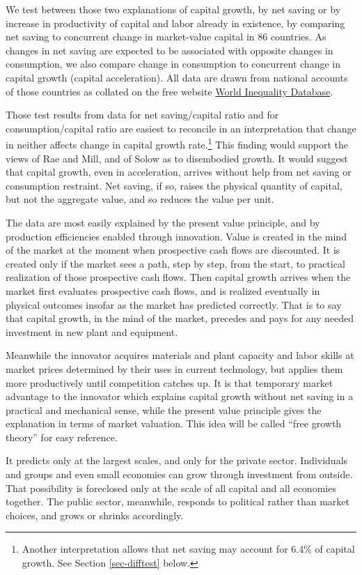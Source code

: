 \documentclass[a4paper,fleqn]{latex_styles/cas-sc}
\begin{document}
We test between those two explanations of capital growth, by net
saving or by increase in productivity of capital and labor already
in existence, by comparing net saving to concurrent change in
market-value capital in 86 countries. As changes in net saving
are expected to be associated with opposite changes in consumption, we
also compare change in consumption to concurrent change in capital
growth (capital acceleration). All data are drawn from national accounts
of those countries as collated on the free website \href{https://wid.world/}{World Inequality Database}.

Those test results from data for net saving/capital ratio and for consumption/capital ratio
are easiest to reconcile in an interpretation that change in neither affects
change in capital growth rate.\footnote{Another interpretation allows that net
saving may account for 6.4\% of capital growth. See Section \ref{sec-difftest}
below.} This finding would support the views of Rae and Mill, and of
Solow as to disembodied growth. It would suggest that capital growth, even in
acceleration, arrives without help from net saving or consumption restraint.
Net saving, if so, raises the physical quantity of capital, but not the
aggregate value, and so reduces the value per unit.

The data are most easily explained by the present value principle,
and by production efficiencies enabled through innovation. Value is
created in the mind of the market at the moment when prospective cash
flows are discounted. It is created only if the market sees a path, step
by step, from the start, to practical realization of those prospective
cash flows. Then capital growth arrives when the market first evaluates
prospective cash flows, and is realized eventually in physical outcomes
insofar as the market has predicted correctly. That is to say that capital
growth, in the mind of the market, precedes and pays for any needed investment
in new plant and equipment.

Meanwhile the innovator
acquires materials and plant capacity and labor skills at market prices
determined by their uses in current technology, but applies them more
productively until competition catches up. It is that temporary market
advantage to the innovator which explains capital growth without net
saving in a practical and mechanical sense, while the present value
principle gives the explanation in terms of market valuation. This idea
will be called ``free growth theory'' for easy reference.

It predicts only at the largest scales, and only for the private sector.
Individuals and groups and even small economies can grow through
investment from outside. That possibility is foreclosed only at the
scale of all capital and all economies together. The public sector,
meanwhile, responds to political rather than market choices, and grows
or shrinks accordingly.
\end{document}
